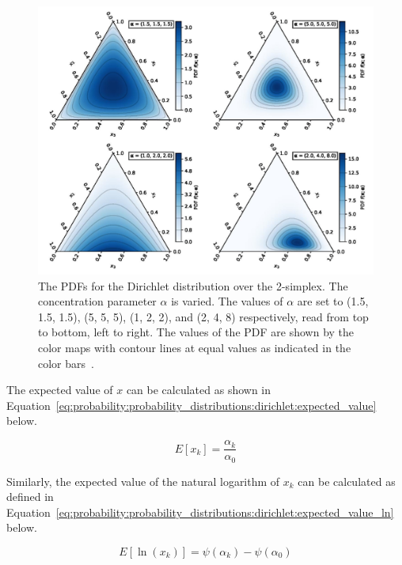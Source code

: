 \begin{figure}[htbp]
      \includegraphics[width=\textwidth]{images/dirichlet.jpg}
      \caption{The \acp{PDF} for the Dirichlet distribution over the 2-simplex. The concentration parameter $\alpha$ is varied. The values of $\alpha$ are set to (1.5, 1.5, 1.5), (5, 5, 5), (1, 2, 2), and (2, 4, 8) respectively, read from top to bottom, left to right. The values of the \ac{PDF} are shown by the color maps with contour lines at equal values as indicated in the color bars~\cite{ref:dirichlet:2020}.}
      \label{fig:probability:probability_distributions:dirichlet}
\end{figure}

The expected value of $x$ can be calculated as shown in Equation~\eqref{eq:probability:probability_distributions:dirichlet:expected_value} below.

\begin{equation}
      \label{eq:probability:probability_distributions:dirichlet:expected_value}
      E[x_{k}] = \frac{\alpha_{k}}{\alpha_{0}}
\end{equation}

Similarly, the expected value of the natural logarithm of $x_{k}$ can be calculated as defined in Equation~\eqref{eq:probability:probability_distributions:dirichlet:expected_value_ln} below.

\begin{equation}
      \label{eq:probability:probability_distributions:dirichlet:expected_value_ln}
      E[\ln(x_{k})] = \psi({\alpha_{k}}) - \psi(\alpha_{0})
\end{equation}

